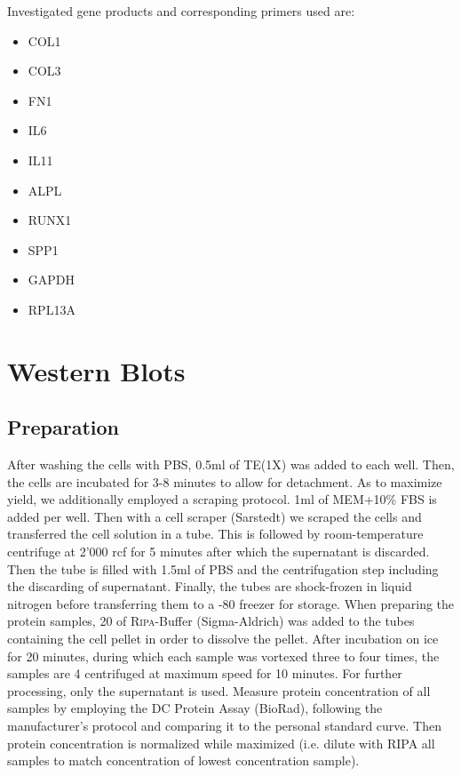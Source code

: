 Investigated gene products and corresponding primers used are: 
\begin{itemize}
\item COL1
\item COL3
\item FN1
\item IL6
\item IL11
\item ALPL
\item RUNX1
\item SPP1
\item GAPDH 
\item RPL13A
\end{itemize}

\section{Western Blots}
\subsection{Preparation}
After washing the cells with PBS, 0.5ml of TE(1X) was added to each well. Then, the cells are incubated for 3-8 minutes to allow for detachment. As to maximize yield, we additionally employed a scraping protocol. 1ml of MEM\textalpha{}+10\% FBS is added per well. Then with a cell scraper (Sarstedt) we scraped the cells and transferred the cell solution in a tube. This is followed by room-temperature centrifuge at 2'000 rcf for 5 minutes after which the supernatant is discarded. Then the tube is filled with 1.5ml of PBS and the centrifugation step including the discarding of supernatant. Finally, the tubes are shock-frozen in liquid nitrogen before transferring them to a -80 \degC freezer for storage.
When preparing the protein samples, 20\mul{} of \textsc{Ripa}-Buffer (Sigma-Aldrich) was added to the tubes containing the cell pellet in order to dissolve the pellet. After incubation on ice for 20 minutes, during which each sample was vortexed three to four times, the samples are 4 \degC centrifuged at maximum speed for 10 minutes. For further processing, only the supernatant is used. Measure protein concentration of all samples by employing the DC\texttrademark{} Protein Assay (BioRad), following the manufacturer's protocol and comparing it to the personal standard curve. Then protein concentration is normalized while maximized (i.e. dilute with RIPA all samples to match concentration of lowest concentration sample). 

